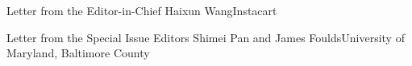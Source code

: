 \documentclass[11pt]{article}
\begin{document}


\begin{bulletin}


%
%

\begin{lettersection}


\begin{letter}{Letter from the Editor-in-Chief}
{Haixun Wang}{Instacart}

\end{letter}
%
\newpage
%
%
\begin{letter}{Letter from the Special Issue Editors} %
{Shimei Pan and James Foulds}{University of Maryland, Baltimore County}


\end{letter}

\end{lettersection}


%


\end{bulletin}
\end{document}
